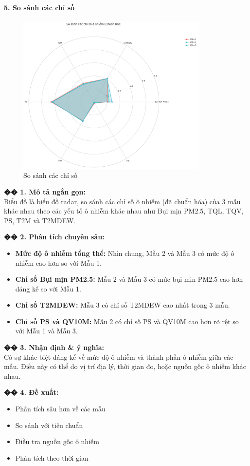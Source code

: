 \documentclass[12pt,a4paper]{article}
\begin{document}
\paragraph{5. So sánh các chỉ số}

\begin{figure}[H]
\centering
\includegraphics[width=0.85\textwidth]{results_comb_PM25_Hanoi_2018_sm_20251011_121424/20251011_121424_so_sanh_chi_so.png}
\caption{So sánh các chỉ số}
\end{figure}

\begin{aibox}
\textbf{�� 1. Mô tả ngắn gọn:}\\
Biểu đồ là biểu đồ radar, so sánh các chỉ số ô nhiễm (đã chuẩn hóa) của 3 mẫu khác nhau theo các yếu tố ô nhiễm khác nhau như Bụi mịn PM2.5, TQL, TQV, PS, T2M và T2MDEW.

\textbf{�� 2. Phân tích chuyên sâu:}
\begin{itemize}
    \item \textbf{Mức độ ô nhiễm tổng thể:} Nhìn chung, Mẫu 2 và Mẫu 3 có mức độ ô nhiễm cao hơn so với Mẫu 1.
    \item \textbf{Chỉ số Bụi mịn PM2.5:} Mẫu 2 và Mẫu 3 có mức bụi mịn PM2.5 cao hơn đáng kể so với Mẫu 1.
    \item \textbf{Chỉ số T2MDEW:} Mẫu 3 có chỉ số T2MDEW cao nhất trong 3 mẫu.
    \item \textbf{Chỉ số PS và QV10M:} Mẫu 2 có chỉ số PS và QV10M cao hơn rõ rệt so với Mẫu 1 và Mẫu 3.
\end{itemize}

\textbf{�� 3. Nhận định \& ý nghĩa:}\\
Có sự khác biệt đáng kể về mức độ ô nhiễm và thành phần ô nhiễm giữa các mẫu. Điều này có thể do vị trí địa lý, thời gian đo, hoặc nguồn gốc ô nhiễm khác nhau.

\textbf{�� 4. Đề xuất:}
\begin{itemize}
    \item Phân tích sâu hơn về các mẫu
    \item So sánh với tiêu chuẩn
    \item Điều tra nguồn gốc ô nhiễm
    \item Phân tích theo thời gian
\end{itemize}
\end{aibox}
\end{document}
